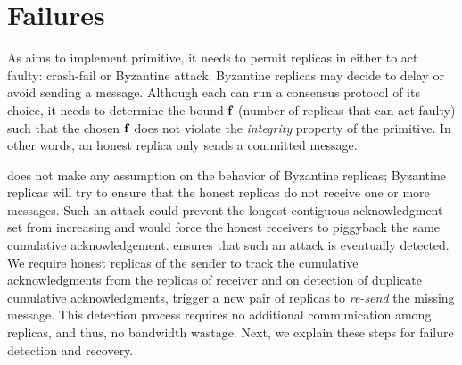\section{Failures}
As \Scrooge{} aims to implement \CCC{} primitive, it needs to permit replicas in either  
to act faulty: crash-fail or Byzantine attack; 
Byzantine replicas may decide to delay or avoid sending a message. 
Although each \RSM{} can run a consensus protocol 
of its choice, it needs to determine the bound $\textbf{f}_{}$ (number of replicas that can act faulty) 
such that the chosen $\textbf{f}_{}$ does not violate the {\em integrity} property of the \CCC{} primitive.
In other words, an honest replica only sends a committed message. 


\Scrooge{} does not make any assumption on the behavior of Byzantine replicas; 
Byzantine replicas will try to ensure that the honest replicas do not receive one or more messages.
Such an attack could  prevent the longest contiguous acknowledgment set from increasing and 
would force the honest receivers to piggyback the same cumulative acknowledgement.
\Scrooge{} ensures that such an attack is eventually detected.
We require honest replicas of the sender \RSM{} to track the cumulative acknowledgments  
from the replicas of receiver \RSM{}
and on detection of duplicate cumulative acknowledgments, 
trigger a new pair of replicas to {\em re-send} the missing message.
This detection process requires no additional communication among replicas, and 
thus, no bandwidth wastage.
Next, we explain these steps for failure detection and recovery.


